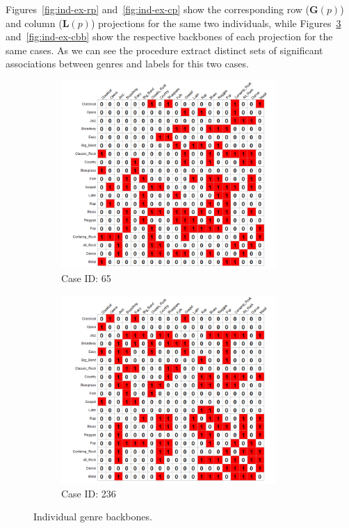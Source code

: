 \documentclass[12pt]{article}
\begin{document}
Figures~\ref{fig:ind-ex-rp} and~\ref{fig:ind-ex-cp} show the corresponding row ($\mathbf{G}(p)$) and column ($\mathbf{L}(p)$) projections for the same two individuals, while Figures~\ref{fig:ind-ex-rbb} and~\ref{fig:ind-ex-cbb} show the respective backbones of each projection for the same cases. As we can see the procedure extract distinct sets of significant associations between genres and labels for this two cases. 

\begin{figure}[ht!]
    \captionsetup[subfigure]{font=footnotesize,labelfont=footnotesize}
    \centering
     \begin{subfigure}[b]{0.49\textwidth}
        \includegraphics[trim={1cm 0cm 0cm 0cm},clip, width=0.9\textwidth]{Plots/data-ex-rbb1.png}
            \caption{Case ID: 65}
            \label{fig:ind-ex-rbb1}
    \end{subfigure}
     \begin{subfigure}[b]{0.49\textwidth}
        \includegraphics[trim={1cm 0cm 0cm 0cm},clip, width=0.9\textwidth]{Plots/data-ex-rbb2.png}
            \caption{Case ID: 236}
            \label{fig:ind-ex-rbb2}
    \end{subfigure}
    \caption{Individual genre backbones.}
    \label{fig:ind-ex-rbb}
\end{figure}
\end{document}
